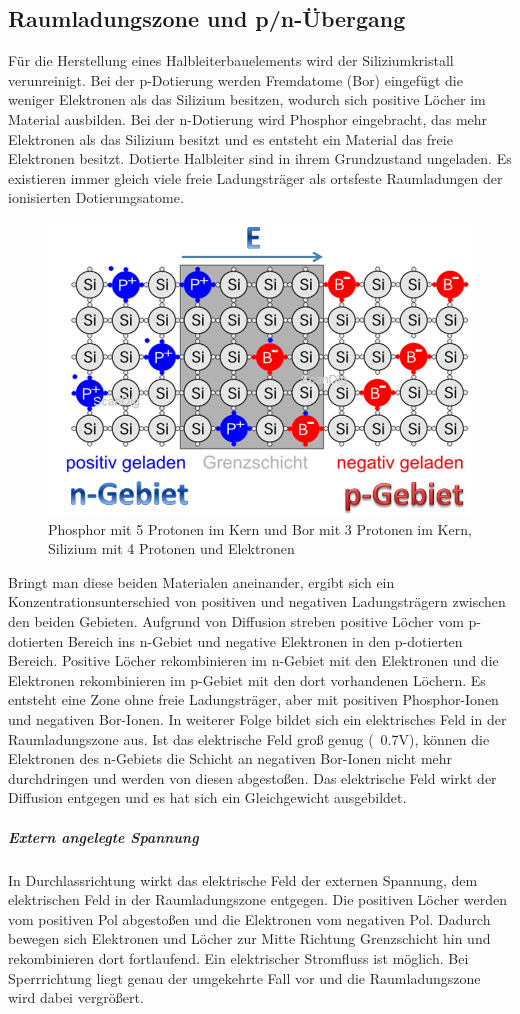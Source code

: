		\subsection{Raumladungszone und p/n-Übergang}
			Für die Herstellung eines Halbleiterbauelements wird der Siliziumkristall verunreinigt. Bei der p-Dotierung werden Fremdatome (Bor) eingefügt die weniger Elektronen als das Silizium besitzen, wodurch sich positive Löcher im Material ausbilden. Bei der n-Dotierung wird Phosphor eingebracht, das mehr Elektronen als das Silizium besitzt und es entsteht ein Material das freie Elektronen besitzt. Dotierte Halbleiter sind in ihrem Grundzustand ungeladen. Es existieren immer gleich viele freie Ladungsträger als ortsfeste Raumladungen der ionisierten Dotierungsatome.
			\begin{figure}[h]
				\centering
				\includegraphics[width=0.4\linewidth]{./pics/el/si}
				\caption{Phosphor mit 5 Protonen im Kern und Bor mit 3 Protonen im Kern, Silizium mit 4 Protonen und Elektronen}
			\end{figure}
			Bringt man diese beiden Materialen aneinander, ergibt sich ein Konzentrationsunterschied von positiven und negativen Ladungsträgern zwischen den beiden Gebieten. Aufgrund von Diffusion streben positive Löcher vom p-dotierten Bereich ins n-Gebiet und negative Elektronen in den p-dotierten Bereich. Positive Löcher rekombinieren im n-Gebiet mit den Elektronen und die Elektronen rekombinieren im p-Gebiet mit den dort vorhandenen Löchern. Es entsteht eine Zone ohne freie Ladungsträger, aber mit positiven Phosphor-Ionen und negativen Bor-Ionen. In weiterer Folge bildet sich ein elektrisches Feld in der Raumladungszone aus. Ist das elektrische Feld groß genug (~0.7V), können die Elektronen des n-Gebiets die Schicht an negativen Bor-Ionen nicht mehr durchdringen und werden von diesen abgestoßen. Das elektrische Feld wirkt der Diffusion entgegen und es hat sich ein Gleichgewicht ausgebildet.
			\subparagraph*{Extern angelegte Spannung} 
				In Durchlassrichtung wirkt das elektrische Feld der externen Spannung, dem elektrischen Feld in der Raumladungszone entgegen. Die positiven Löcher werden vom positiven Pol abgestoßen und die Elektronen vom negativen Pol. Dadurch bewegen sich Elektronen und Löcher zur Mitte Richtung Grenzschicht hin und rekombinieren dort fortlaufend. Ein elektrischer Stromfluss ist möglich. Bei Sperrrichtung liegt genau der umgekehrte Fall vor und die Raumladungszone wird dabei vergrößert.
